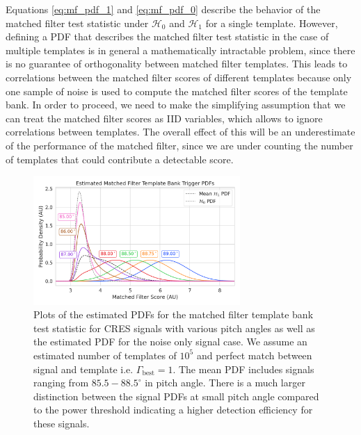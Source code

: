 Equations \ref{eq:mf_pdf_1} and \ref{eq:mf_pdf_0} describe the behavior of the matched filter test statistic under $\mathcal{H}_0$ and $\mathcal{H}_1$ for a single template. However, defining a PDF that describes the matched filter test statistic in the case of multiple templates is in general a mathematically intractable problem, since there is no guarantee of orthogonality between matched filter templates. This leads to correlations between the matched filter scores of different templates because only one sample of noise is used to compute the matched filter scores of the template bank. In order to proceed, we need to make the simplifying assumption that we can treat the matched filter scores as IID variables, which allows to ignore correlations between templates. The overall effect of this will be an underestimate of the performance of the matched filter, since we are under counting the number of templates that could contribute a detectable score.
 
\begin{figure}[htbp]
    \centering
    \includegraphics[width=0.7\textwidth]{figs/Chapter-4/230329_mf_pdf_by_pitch.png}
    \caption{Plots of the estimated PDFs for the matched filter template bank test statistic for CRES signals with various pitch angles as well as the estimated PDF for the noise only signal case. We assume an estimated number of templates of $10^5$ and perfect match between signal and template i.e. $\Gamma_\mathrm{best}=1$. The mean PDF includes signals ranging from $85.5-88.5^\circ$ in pitch angle. There is a much larger distinction between the signal PDFs at small pitch angle compared to the power threshold indicating a higher detection efficiency for these signals.}
    \label{fig:mf_pdf}
\end{figure}

